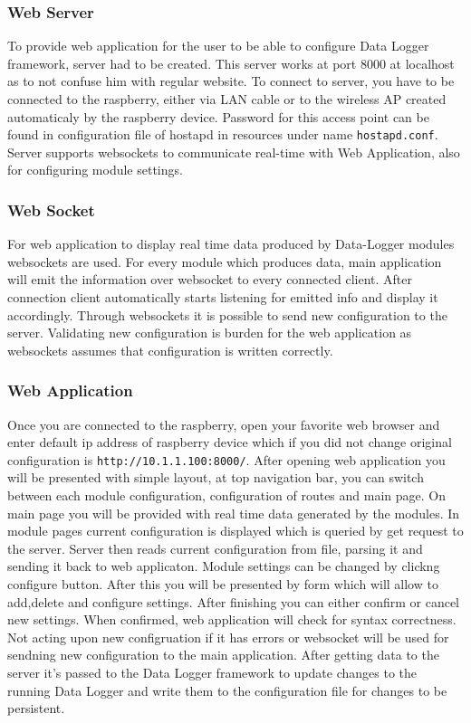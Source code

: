 \subsubsection{Web Server} %
\label{ssub:web_server}
To provide web application for the user to be able to configure Data Logger framework, server had to be created. This server works at port 8000 at localhost as to not confuse him with regular website. To connect to server, you have to be connected to the raspberry, either via LAN cable or to the wireless AP created automaticaly by the raspberry device. Password for this access point can be found in configuration file of hostapd in resources under name \verb|hostapd.conf|. Server supports websockets to communicate real-time with Web Application, also for configuring module settings.
\subsubsection{Web Socket} %
\label{ssub:web_socket}
For web application to display real time data produced by Data-Logger modules websockets are used. For every module which produces data, main application will emit the information over websocket to every connected client. After connection client automatically starts listening for emitted info and display it accordingly. Through websockets it is possible to send new configuration to the server. Validating new configuration is burden for the web application as websockets assumes that configuration is written correctly.
\subsubsection{Web Application} %
\label{ssub:web_application}
Once you are connected to the raspberry, open your favorite web browser and enter default ip address of raspberry device which if you did not change original configuration is \verb|http://10.1.1.100:8000/|. After opening web application you will be presented with simple layout, at top navigation bar, you can switch between each module configuration, configuration of routes and main page. On main page you will be provided with real time data generated by the modules. In module pages current configuration is displayed which is queried by get request to the server. Server then reads current configuration from file, parsing it and sending it back to web applicaton. Module settings can be changed by clickng configure button. After this you will be presented by form which will allow to add,delete and configure settings. After finishing you can either confirm or cancel new settings. When confirmed, web application will check for syntax correctness. Not acting upon new configruation if it has errors or websocket will be used for sendning new configuration to the main application. After getting data to the server it's passed to the Data Logger framework to update changes to the running Data Logger and write them to the configuration file for changes to be persistent.
